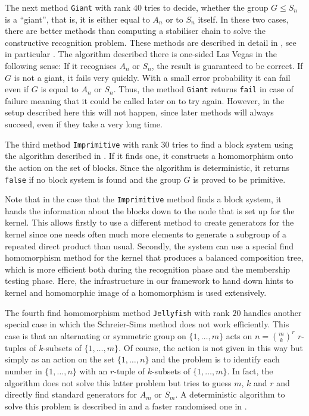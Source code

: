 The next method \texttt{Giant} with rank $40$ tries to decide, whether the
group $G \le S_n$ is a ``giant'', that is, it is either equal to
$A_n$ or to $S_n$ itself. In these two cases, there are better methods than
computing a stabiliser chain to solve the constructive recognition problem.
These methods are described in detail in \cite[Section~10.2]{Ser}, see
in particular \cite[Section~10.2.4]{Ser}. The algorithm described there
is one-sided Las Vegas in the following sense:  If it recognises $A_n$ or
$S_n$, the result is guaranteed to be correct. If $G$ is not a giant, it
fails very quickly. With a small error probability it can fail even if
$G$ is equal to $A_n$ or $S_n$. Thus, the method \texttt{Giant} returns
\texttt{fail} in case of failure meaning that it could be called later
on to try again. However, in the setup described here this will not
happen, since later methods will always succeed, even if they take a
very long time.

The third method \texttt{Imprimitive} with rank $30$ tries to find a block
system using the algorithm described in \cite[Section~5.5.1]{Ser}. If it 
finds one, it constructs a homomorphism onto the action on the set of
blocks. Since the algorithm is deterministic, it returns \texttt{false}
if no block system is found and the group $G$ is proved to be primitive.

Note that in the case that the \texttt{Imprimitive} method finds a block
system, it hands the information about the blocks down to the node that is
set up for the kernel. This allows firstly to use a different method to
create generators for the kernel since one needs often much more elements
to generate a subgroup of a repeated direct product than usual. Secondly,
the system can use a special find homomorphism
method for the kernel that produces a balanced composition tree, which 
is more efficient both during the recognition phase and the membership
testing phase. Here, the infrastructure in our framework to hand down 
hints to kernel and homomorphic image of a homomorphism is used 
extensively.

The fourth find homomorphism method \texttt{Jellyfish} with rank $20$
handles another special case in which the Schreier-Sims method does
not work efficiently. This case is that an alternating or symmetric
group on $\{1,\ldots,m\}$ acts on $n = {m \choose k}^r$ $r$-tuples
of $k$-subsets of $\{1,\ldots,m\}$. Of course, the action is not
given in this way but simply as an action on the set $\{1,\ldots,n\}$
and the problem is to identify each number in $\{1,\ldots,n\}$ with
an $r$-tuple of $k$-subsets of $\{ 1, \ldots, m\}$. In fact, the
algorithm does not solve this latter problem but tries to guess
$m$, $k$ and $r$ and directly find standard generators for $A_m$ or
$S_m$. A deterministic algorithm to solve this problem is described
in \cite[Section~4]{fastmanag} and a faster randomised one in
\cite{Jellyfish}.

